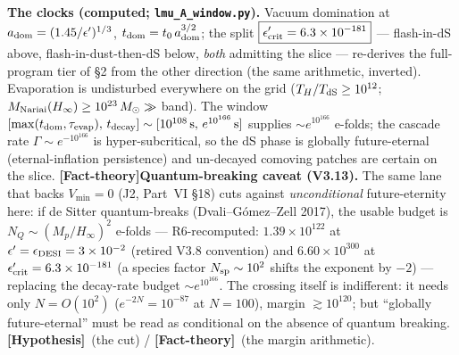 \documentclass[11pt]{article}
\newcommand{\factth}{\textcolor{green!40!black}{\textbf{[Fact-theory]}}}
\newcommand{\hyp}{\textcolor{orange!80!black}{\textbf{[Hypothesis]}}}
\newcommand{\msun}{M_\odot}
\begin{document}
\textbf{The clocks (computed; \texttt{lmu\_A\_window.py}).} Vacuum domination at $a_{\rm dom}=(1.45/\epsilon')^{1/3}$, $t_{\rm dom}=t_0\,a_{\rm dom}^{3/2}$; the split $\boxed{\epsilon'_{\rm crit}=6.3\times10^{-181}}$ --- flash-in-dS above, flash-in-dust-then-dS below, \emph{both} admitting the slice --- re-derives the full-program tier of \S2 from the other direction (the same arithmetic, inverted). Evaporation is undisturbed everywhere on the grid ($T_H/T_{\rm dS}\ge10^{12}$; $M_{\rm Nariai}(H_\infty)\ge10^{23}\,\msun\gg$ band). The window $[\max(t_{\rm dom},\tau_{\rm evap}),\,t_{\rm decay}]\sim[10^{108}\,\text{s},\,e^{10^{166}}\,\text{s}]$ supplies $\sim e^{10^{166}}$ e-folds; the cascade rate $\Gamma\sim e^{-10^{166}}$ is hyper-subcritical, so the dS phase is globally future-eternal (eternal-inflation persistence) and un-decayed comoving patches are certain on the slice. \factth \textbf{Quantum-breaking caveat (V3.13).} The same lane that backs $V_{\min}=0$ (J2, Part~VI \S18) cuts against \emph{unconditional} future-eternity here: if de Sitter quantum-breaks (Dvali--G\'omez--Zell 2017), the usable budget is $N_Q\sim(M_p/H_\infty)^2$ e-folds --- R6-recomputed: $1.39\times10^{122}$ at $\epsilon'=\epsilon_{\rm DESI}=3\times10^{-2}$ (retired V3.8 convention) and $6.60\times10^{300}$ at $\epsilon'_{\rm crit}=6.3\times10^{-181}$ (a species factor $N_{\rm sp}\sim10^{2}$ shifts the exponent by $-2$) --- replacing the decay-rate budget $\sim e^{10^{166}}$. The crossing itself is indifferent: it needs only $N=O(10^{2})$ ($e^{-2N}=10^{-87}$ at $N=100$), margin $\gtrsim10^{120}$; but ``globally future-eternal'' must be read as conditional on the absence of quantum breaking. \hyp\ (the cut) / \factth\ (the margin arithmetic).
\end{document}
